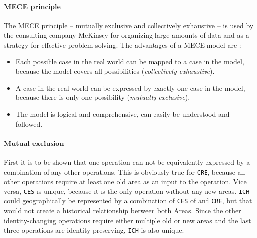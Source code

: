 \addtocounter{footnote}{-4}
\addtocounter{footnote}{1}
\addtocounter{footnote}{1}
\addtocounter{footnote}{1}
\addtocounter{footnote}{1}


\paragraph{MECE principle} %
\label{par:mece_principle}

The MECE principle -- mutually exclusive and collectively exhaustive -- is used by the consulting company McKinsey for organizing large amounts of data and as a strategy for effective problem solving. The advantages of a MECE model are \cite{mece}:
\begin{itemize}
  \item Each possible case in the real world can be mapped to a case in the model, because the model covers all possibilities (\emph{collectively exhaustive}).
  \item A case in the real world can be expressed by exactly one case in the model, because there is only one possibility (\emph{mutually exclusive}).
  \item The model is logical and comprehensive, can easily be understood and followed.
\end{itemize}


\paragraph{Mutual exclusion} %
\label{par:mutual_exclusion}

First it is to be shown that one operation can not be equivalently expressed by a combination of any other operations. This is obviously true for \texttt{CRE}, because all other operations require at least one old area as an input to the operation. Vice versa, \texttt{CES} is unique, because it is the only operation without any new areas. \texttt{ICH} could geographically be represented by a combination of \texttt{CES} of and \texttt{CRE}, but that would not create a historical relationship between both Areas. Since the other identity-changing operations require either multiple old or new areas and the last three operations are identity-preserving, \texttt{ICH} is also unique.

